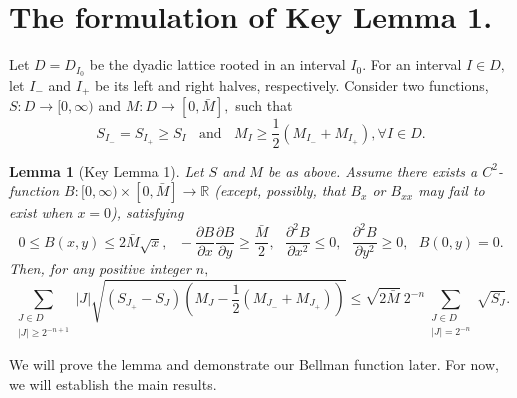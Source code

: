 \documentclass[psamsfonts]{conm-p-l}
\newtheorem{lemma}[theorem]{Lemma}
\theoremstyle{definition}
\theoremstyle{remark}
\numberwithin{equation}{section}
\begin{document}
\section{The formulation of Key Lemma 1.} 
Let $D=D_{I_0}$ be the dyadic lattice rooted in an interval $I_0.$ For an interval $I \in D,$ let $I_-$ and $I_+$ be its left and right halves, respectively.  Consider two functions, $S: D\to [0,\infty)$ and $M: D\to [0,\bar{M}],$ such that 
{\begin{equation}\label{d01}{
S_{I_-}=S_{I_+}\ge S_I~~~~\text{and}~~~~ 
M_I\ge \frac12(M_{I_-}+M_{I_+}),\forall I\in D. 
}\end{equation}}
\begin{lemma}[Key Lemma 1]Let $S$ and $M$ be as above. Assume there exists a $C^2\!\!$-function $B: [0,\infty)\times [0,\bar{M}]\to \mathbb{R}$ (except, possibly, that $B_x$ or $B_{xx}$ may fail to exist when $x=0$), satisfying
{\begin{equation}\label{d02}{
0\le B(x,y)\le 2\bar{M}\sqrt{x},~~~
-\frac{{{\partial}\!} B}{{\partial} x}\frac{{{\partial}\!} B}{{\partial} y}\ge \frac{\bar{M}}2,~~~
\frac{{\partial}^2\! B}{{\partial} x^2}\le 0,~~~\frac{{\partial}^2\! B}{{\partial} y^2}\ge 0,~~~B(0,y)=0.
}\end{equation}}
Then, for any positive integer $n,$
{\begin{equation}\label{d03}{
\sum_
{\substack{ 
J\in D\\
|J|\ge2^{{-n+1}} 
}}
|J|\sqrt{(S_{J_+}-S_J)\left(M_J-\frac12(M_{J_-}+M_{J_+})\right)}
\le
\sqrt{2\bar{M}}~2^{-n}
\sum_
{\substack{ 
J\in D\\
|J|=2^{{-n}} 
}}
\sqrt{S_J}.
}\end{equation}}
\end{lemma}
We will prove the lemma and demonstrate our Bellman function later. For now, we will establish the main results.
\end{document}
